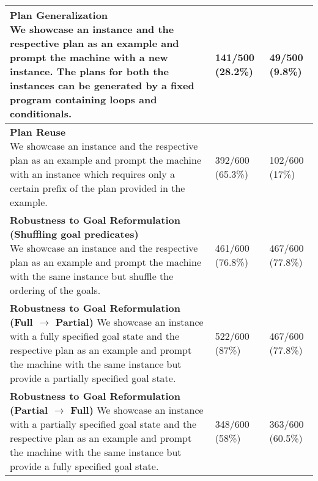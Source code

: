 \begin{table*}[t]
\begin{tabular}{p{10cm}  p{1.05cm}  p{1.2cm} }
        \specialcell{\textbf{Plan Generalization} \\{\scriptsize We showcase an instance and the respective plan as an example and prompt the machine with a new instance. The plans for both the instances can be generated by a fixed program containing loops and conditionals.}} & 141/500 (28.2\%) & 49/500 (9.8\%) \\ \midrule[0.08em]
        \specialcell{\textbf{Plan Reuse} \\{\scriptsize We showcase an instance and the respective plan as an example and prompt the machine with an instance which requires only a certain prefix of the plan provided in the example.}} & 392/600 (65.3\%) & 102/600 (17\%)  \\ \midrule[0.08em] 
        \specialcell{\textbf{Robustness to Goal Reformulation {\small (Shuffling goal predicates)}} \\{\scriptsize We showcase an instance and the respective plan as an example and prompt the machine with the same instance but shuffle the ordering of the goals.}} & 461/600 (76.8\%) & 467/600 (77.8\%) \\ \midrule[0.08em]
        \specialcell{\textbf{Robustness to Goal Reformulation {\small (Full $\rightarrow$ Partial)}}\\{\scriptsize We showcase an instance with a fully specified goal state and the respective plan as an example and prompt the machine with the same instance but provide a partially specified goal state.}}& 522/600 (87\%) & 467/600 (77.8\%) \\ \midrule[0.08em] 
        \specialcell{\textbf{Robustness to Goal Reformulation {\small (Partial $\rightarrow$ Full)} }\\ {\scriptsize We showcase an instance with a partially specified goal state and the respective plan as an example and prompt the machine with the same instance but provide a fully specified goal state.}}& 348/600 (58\%) & 363/600 (60.5\%)  \\ \bottomrule 
    \end{tabular}
    \vspace*{-0.2in}
\end{table*}

